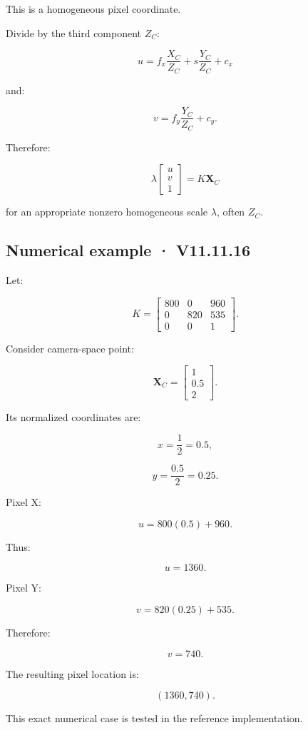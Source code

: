 This is a homogeneous pixel coordinate.

Divide by the third component \(Z_C\):

\[
 \boxed{ u=f_x\frac{X_C}{Z_C} +s\frac{Y_C}{Z_C} +c_x }
\]

and:

\[
 \boxed{ v=f_y\frac{Y_C}{Z_C} +c_y }.
\]

Therefore:

\[
 \boxed{ \lambda \begin{bmatrix}u\\v\\1\end{bmatrix} = K\mathbf X_C }
\]

for an appropriate nonzero homogeneous scale \(\lambda\), often \(Z_C\).

\subsection{Numerical example · V11.11.16}\label{02-foundations-ii-ch034-numerical-example-v11.11.16}

Let:

\[
 K= \begin{bmatrix} 800&0&960\\ 0&820&535\\ 0&0&1 \end{bmatrix}.
\]

Consider camera-space point:

\[
 \mathbf X_C= \begin{bmatrix}1\\0.5\\2\end{bmatrix}.
\]

Its normalized coordinates are:

\[
 x=\frac12=0.5,
\]

\[
 y=\frac{0.5}{2}=0.25.
\]

Pixel X:

\[
 u=800(0.5)+960.
\]

Thus:

\[
 \boxed{u=1360}.
\]

Pixel Y:

\[
 v=820(0.25)+535.
\]

Therefore:

\[
 \boxed{v=740}.
\]

The resulting pixel location is:

\[
 \boxed{(1360,740)}.
\]

This exact numerical case is tested in the reference implementation.

